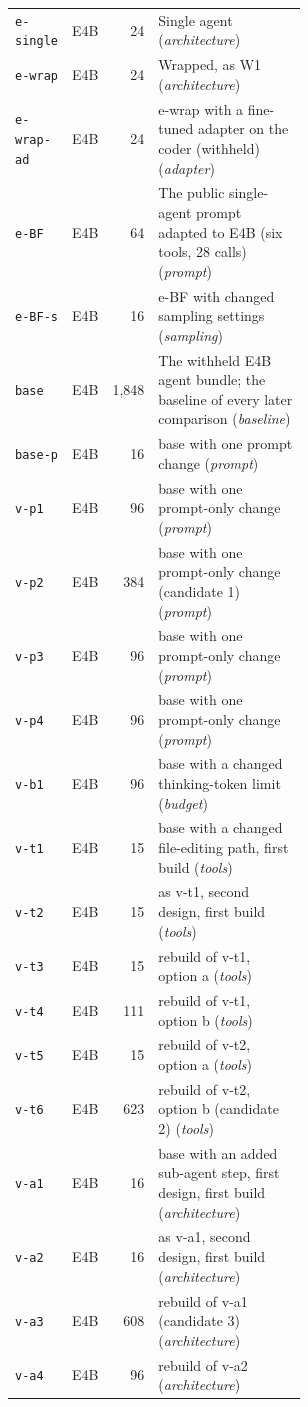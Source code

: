 \begin{table}[p]
\begin{tabular}{llrp{0.58\linewidth}}
\texttt{e-single} & E4B & 24 & Single agent (\emph{architecture}) \\
\texttt{e-wrap} & E4B & 24 & Wrapped, as W1 (\emph{architecture}) \\
\texttt{e-wrap-ad} & E4B & 24 & e-wrap with a fine-tuned adapter on the coder (withheld) (\emph{adapter}) \\
\texttt{e-BF} & E4B & 64 & The public single-agent prompt adapted to E4B (six tools, 28 calls) (\emph{prompt}) \\
\texttt{e-BF-s} & E4B & 16 & e-BF with changed sampling settings (\emph{sampling}) \\
\texttt{base} & E4B & 1{,}848 & The withheld E4B agent bundle; the baseline of every later comparison (\emph{baseline}) \\
\texttt{base-p} & E4B & 16 & base with one prompt change (\emph{prompt}) \\
\texttt{v-p1} & E4B & 96 & base with one prompt-only change (\emph{prompt}) \\
\texttt{v-p2} & E4B & 384 & base with one prompt-only change (candidate 1) (\emph{prompt}) \\
\texttt{v-p3} & E4B & 96 & base with one prompt-only change (\emph{prompt}) \\
\texttt{v-p4} & E4B & 96 & base with one prompt-only change (\emph{prompt}) \\
\texttt{v-b1} & E4B & 96 & base with a changed thinking-token limit (\emph{budget}) \\
\texttt{v-t1} & E4B & 15 & base with a changed file-editing path, first build (\emph{tools}) \\
\texttt{v-t2} & E4B & 15 & as v-t1, second design, first build (\emph{tools}) \\
\texttt{v-t3} & E4B & 15 & rebuild of v-t1, option a (\emph{tools}) \\
\texttt{v-t4} & E4B & 111 & rebuild of v-t1, option b (\emph{tools}) \\
\texttt{v-t5} & E4B & 15 & rebuild of v-t2, option a (\emph{tools}) \\
\texttt{v-t6} & E4B & 623 & rebuild of v-t2, option b (candidate 2) (\emph{tools}) \\
\texttt{v-a1} & E4B & 16 & base with an added sub-agent step, first design, first build (\emph{architecture}) \\
\texttt{v-a2} & E4B & 16 & as v-a1, second design, first build (\emph{architecture}) \\
\texttt{v-a3} & E4B & 608 & rebuild of v-a1 (candidate 3) (\emph{architecture}) \\
\texttt{v-a4} & E4B & 96 & rebuild of v-a2 (\emph{architecture}) \\
\bottomrule
\end{tabular}
\end{table}
